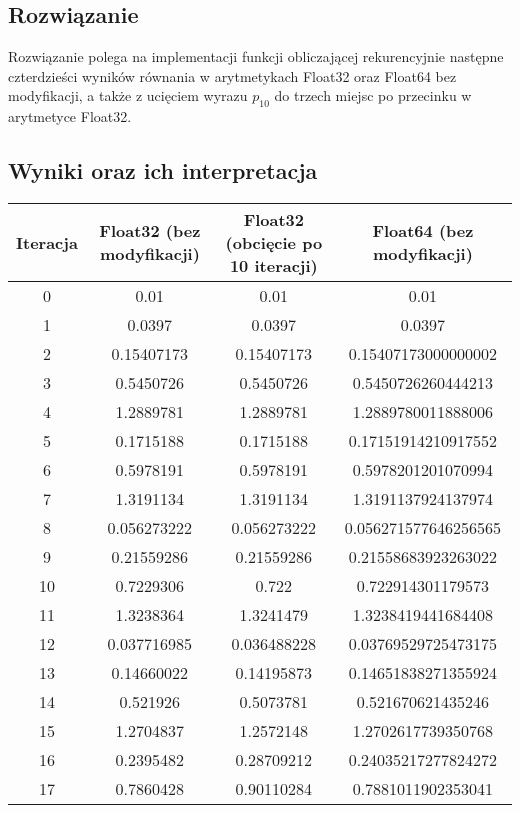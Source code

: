 \documentclass{article}
\begin{document}
\subsection{Rozwiązanie}
Rozwiązanie polega na implementacji funkcji obliczającej rekurencyjnie następne czterdzieści wyników równania w arytmetykach Float32 oraz Float64 bez modyfikacji, a także z ucięciem wyrazu $p_{10}$ do trzech miejsc po przecinku w arytmetyce Float32.
\subsection{Wyniki oraz ich interpretacja}
\begin{table}[H]
\centering
\begin{tabular}{|c|c|c|c|}
\hline
Iteracja & Float32 (bez modyfikacji) & Float32 (obcięcie po 10 iteracji) & Float64 (bez modyfikacji)\\ \hline
0 & 0.01 & 0.01 & 0.01\\ \hline
1 & 0.0397 & 0.0397 & 0.0397\\ \hline
2 & 0.15407173 & 0.15407173 & 0.15407173000000002\\ \hline
3 & 0.5450726 & 0.5450726 & 0.5450726260444213\\ \hline
4 & 1.2889781 & 1.2889781 & 1.2889780011888006\\ \hline
5 & 0.1715188 & 0.1715188 & 0.17151914210917552\\ \hline
6 & 0.5978191 & 0.5978191 & 0.5978201201070994\\ \hline
7 & 1.3191134 & 1.3191134 & 1.3191137924137974\\ \hline
8 & 0.056273222 & 0.056273222 & 0.056271577646256565\\ \hline
9 & 0.21559286 & 0.21559286 & 0.21558683923263022\\ \hline
10 & 0.7229306 & 0.722 & 0.722914301179573\\ \hline
11 & 1.3238364 & 1.3241479 & 1.3238419441684408\\ \hline
12 & 0.037716985 & 0.036488228 & 0.03769529725473175\\ \hline
13 & 0.14660022 & 0.14195873 & 0.14651838271355924\\ \hline
14 & 0.521926 & 0.5073781 & 0.521670621435246\\ \hline
15 & 1.2704837 & 1.2572148 & 1.2702617739350768\\ \hline
16 & 0.2395482 & 0.28709212 & 0.24035217277824272\\ \hline
17 & 0.7860428 & 0.90110284 & 0.7881011902353041\\ \hline

\end{tabular}
\end{table}
\end{document}
